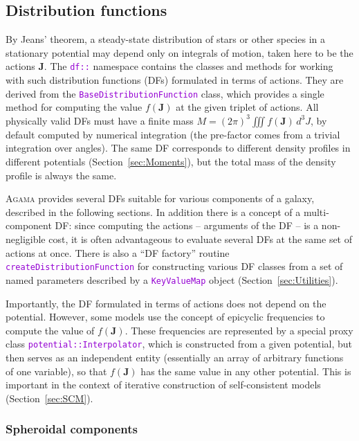 \documentclass[12pt]{article}
\newcommand{\Agama}{\textsc{Agama}\xspace}
\newcommand{\ttt}[1]{\textcolor{darkviolet}{\texttt{#1}}}
\newcommand{\bJ}{\boldsymbol{J}}
\begin{document}
\subsection{Distribution functions}  \label{sec:DF}

By Jeans' theorem, a steady-state distribution of stars or other species in a stationary potential may depend only on integrals of motion, taken here to be the actions $\bJ$. The \ttt{df::} namespace contains the classes and methods for working with such distribution functions (DFs) formulated in terms of actions. They are derived from the \ttt{BaseDistributionFunction} class, which provides a single method for computing the value $f(\bJ)$ at the given triplet of actions. All physically valid DFs must have a finite mass $M = (2\pi)^3 \iiint f(\bJ)\,d^3J$, by default computed by numerical integration (the pre-factor comes from a trivial integration over angles).
The same DF corresponds to different density profiles in different potentials (Section~\ref{sec:Moments}), but the total mass of the density profile is always the same.

\Agama provides several DFs suitable for various components of a galaxy, described in the following sections. In addition there is a concept of a multi-component DF: since computing the actions -- arguments of the DF -- is a non-negligible cost, it is often advantageous to evaluate several DFs at the same set of actions at once.
There is also a ``DF factory'' routine \ttt{createDistributionFunction} for constructing various DF classes from a set of named parameters described by a \ttt{KeyValueMap} object (Section~\ref{sec:Utilities}).

Importantly, the DF formulated in terms of actions does not depend on the potential. However, some models use the concept of epicyclic frequencies to compute the value of $f(\bJ)$. These frequencies are represented by a special proxy class \ttt{potential::Interpolator}, which is constructed from a given potential, but then serves as an independent entity (essentially an array of arbitrary functions of one variable), so that $f(\bJ)$ has the same value in any other potential. This is important in the context of iterative construction of self-consistent models (Section~\ref{sec:SCM}).

\subsubsection{Spheroidal components}  \label{sec:DFspheroid}
\end{document}
